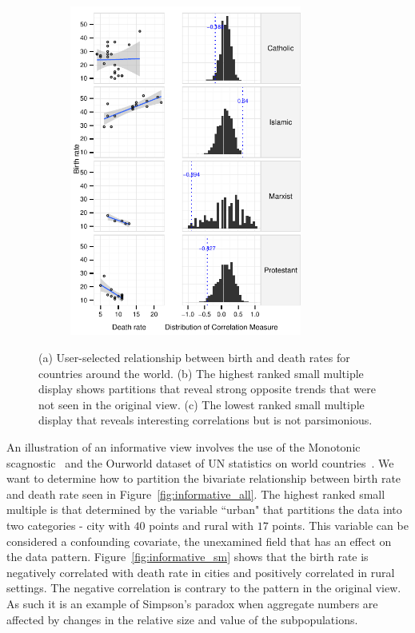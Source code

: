 \begin{figure}
\begin{subfigure}{3in}
		\includegraphics[width=3in]{images/2_56911395752061-LEADER.pdf}
		  \caption{}
		 \label{fig:informative_sm_big}
	 \end{subfigure}
	  \caption{(a) User-selected relationship between birth and death rates for countries around the world. (b) The highest ranked small multiple display shows partitions that reveal strong opposite trends that were not seen in the original view. (c) The lowest ranked small multiple display that reveals interesting correlations but is not parsimonious.}
\end{figure}

An illustration of an informative view involves the use of the Monotonic scagnostic~\cite{Wilkinson2005} and the Ourworld dataset of UN statistics on world countries~\cite{Wilkinson2005GG}. We want to determine how to partition the bivariate relationship between birth rate and death rate seen in Figure~\ref{fig:informative_all}. The highest ranked small multiple is that determined by the variable ``urban" that partitions the data into two categories - city with $40$ points and rural with $17$ points. This variable can be considered a confounding covariate, the unexamined field that has an effect on the data pattern. Figure~\ref{fig:informative_sm} shows that the birth rate is negatively correlated with death rate in cities and positively correlated in rural settings. The negative correlation is contrary to the pattern in the original view. As such it is an example of Simpson's paradox when aggregate numbers are affected by changes in the relative size and value of the subpopulations. 
 
